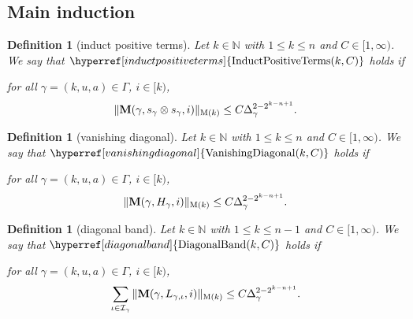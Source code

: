 \documentclass[12pt,reqno]{amsart}
\theoremstyle{plain}
\newtheorem{definition}[theorem]{Definition}
\numberwithin{equation}{section}
\theoremstyle{remark}
\newcommand{\N}{{\mathbb N}}
\newcommand{\M}{\mathbf{M}}
\begin{document}
\subsection{Main induction}

\newcommand{\InductPositiveTerms}[1]{{\hyperref[induct positive terms]{{\rm InductPositiveTerms}(#1)}}}
\begin{definition}[induct positive terms]\label{induct positive terms}
Let $k\in \N$ with $1\le k\le n$ and $C\in [1,\infty)$.
We say that $\InductPositiveTerms{k,C}$ holds if

for all $\gamma=(k,u,a)\in \Gamma$, $i\in [k)$,
\begin{equation}\label{auto:positive-terms-square-root-bound}
    \|\M(\gamma,s_{\gamma} \otimes s_{\gamma},i)\|_{{\rm M}(k)}\le C \Delta_\gamma^{2-2^{k-n+1}}.
\end{equation}
\end{definition}

\newcommand{\VanishingDiagonal}[1]{{\hyperref[vanishing diagonal]{{\rm VanishingDiagonal}(#1)}}}
\begin{definition}[vanishing diagonal]\label{vanishing diagonal}
Let $k\in \N$ with $1\le k\le n$ and $C\in [1,\infty)$.
We say that $\VanishingDiagonal{k,C}$ holds if

for all $\gamma=(k,u,a)\in \Gamma$, $i\in [k)$,
\begin{equation}\label{auto:H-positive-terms-bound}
    \|\M(\gamma,H_\gamma,i)\|_{{\rm M}(k)}
    \le C \Delta_\gamma^{2-2^{k-n+1}} .
\end{equation}
\end{definition}

\newcommand{\DiagonalBand}[1]{{\hyperref[diagonal band]{{\rm DiagonalBand}(#1)}}}
\begin{definition}[diagonal band]\label{diagonal band}
Let $k\in \N$ with $1\le k\le n-1$ and $C\in [1,\infty)$.
We say that $\DiagonalBand{k,C}$ holds if

for all $\gamma=(k,u,a)\in \Gamma$, $i\in [k)$,
\begin{equation}\label{auto:L-positive-terms-sum-bound}
   \sum_{\iota\in\mathcal{I}_{\gamma}}
   \|\M(\gamma,L_{\gamma,\iota},i)\|_{{\rm M}(k)}
   \le C\Delta_\gamma^{2-2^{k-n+1}} .
\end{equation}
\end{definition}
\end{document}
